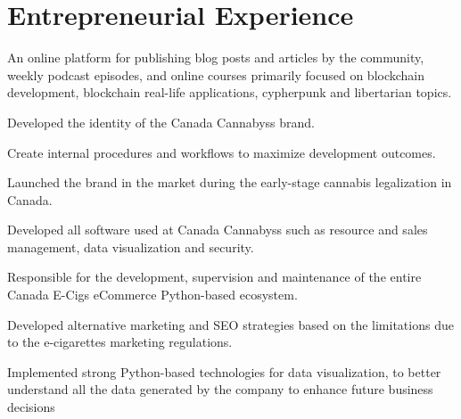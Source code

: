 \documentclass[]{deedy-resume-openfont}
\begin{document}
\hfill
\begin{minipage}[t]{0.5\textwidth} 


\section{Entrepreneurial Experience}

\vspace{\topsep} %
\begin{tightemize}
\item An online platform for publishing blog posts and articles by the community, weekly podcast episodes, and online courses primarily focused on blockchain development, blockchain real-life applications, cypherpunk and libertarian topics.
\end{tightemize}
\sectionsep

\begin{tightemize}
\item Developed the identity of the Canada Cannabyss brand.
\item Create internal procedures and workflows to maximize development outcomes. 
\item Launched the brand in the market during the early-stage cannabis legalization in Canada.
\item Developed all software used at Canada Cannabyss such as resource and sales management, data visualization and security.
\end{tightemize}
\sectionsep


\begin{tightemize}
\item Responsible for the development, supervision and maintenance of the entire Canada E-Cigs eCommerce Python-based ecosystem.
\item Developed alternative marketing and SEO strategies based on the limitations due to the e-cigarettes marketing regulations. 
\item Implemented strong Python-based technologies for data visualization, to better understand all the data generated by the company to enhance future business decisions
\end{tightemize}
\sectionsep


\end{minipage}
\end{document}
